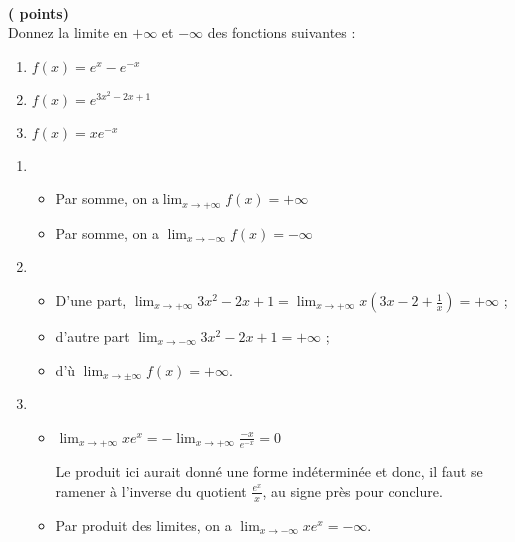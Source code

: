 \documentclass[12pt,a4paper,french]{article}
\theoremstyle{break}
\theoremstyle{plain}
\theoremstyle{nonumberplain}
\theoremstyle{nonumberbreak}
\begin{document}
\begin{question}[ID=limites]
  ~\\[-6ex]
  \phantom{a}\hfill\textbf{( points)}\\
  Donnez la limite en $+\infty$ et $-\infty$ des fonctions suivantes :
  \begin{enumerate}
    \item $f(x) = e^x - e^{-x}$ 
    \item $f(x) = e^{3x^2 -2x +1}$ 
    \item $f(x) = xe^{-x}$ 
  \end{enumerate}
\end{question}
\begin{solution}
  \begin{enumerate}
    \item \begin{itemize}
        \item Par somme, on a$\lim_{x\to+\infty}f(x) = +\infty$
        \item Par somme, on a $\lim_{x\to-\infty}f(x) = -\infty$
      \end{itemize}
    \item \begin{itemize}
        \item D'une part, $\lim_{x\to+\infty} 3x^2 -2x +1 =
          \lim_{x\to+\infty} x\left(3x -2 +\frac1x\right) = +\infty$ ;
        \item d'autre part $\lim_{x\to-\infty} 3x^2 -2x +1 = +\infty$ ;
        \item d'ù $\lim_{x\to\pm\infty} f(x) = +\infty$.
      \end{itemize}
    \item \begin{itemize}
        \item $\lim_{x\to+\infty}xe^x =
          -\lim_{x\to+\infty}\frac{-x}{e^{-x}} = 0$

          Le produit ici aurait donné une forme indéterminée et donc, il
          faut se ramener à l'inverse du quotient $\frac{e^x}x$, au
          signe près pour conclure.
        \item Par produit des limites, on a $\lim_{x\to-\infty}xe^{x} =
          -\infty$.
      \end{itemize}
  \end{enumerate}
\end{solution}
\end{document}
